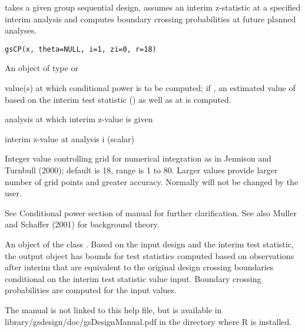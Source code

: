 \begin{Description}\relax
{} takes a given group sequential design, assumes an interim z-statistic 
at a specified interim analysis and computes boundary crossing probabilities at future planned analyses.
\end{Description}
\begin{Usage}
\begin{verbatim}
gsCP(x, theta=NULL, i=1, zi=0, r=18)
\end{verbatim}
\end{Usage}
\begin{Arguments}
\begin{ldescription}
\item[\code{x}] An object of type  or 
\item[\code{theta}]  value(s) at which conditional power is to be computed; if , 
an estimated value of  based on the interim test statistic () as well as at 
is computed.
\item[\code{i}] analysis at which interim z-value is given
\item[\code{zi}] interim z-value at analysis i (scalar)
\item[\code{r}] Integer value controlling grid for numerical integration as in Jennison and Turnbull (2000); 
default is 18, range is 1 to 80. 
Larger values provide larger number of grid points and greater accuracy.
Normally  will not be changed by the user.
\end{ldescription}
\end{Arguments}
\begin{Details}\relax
See Conditional power section of manual for further clarification. See also Muller and Schaffer (2001) for background theory.
\end{Details}
\begin{Value}
An object of the class .
Based on the input design and the interim test statistic, the output object has bounds for test statistics
computed based on observations after interim  that are equivalent to the original design crossing boundaries conditional
on the interim test statistic value input. 
Boundary crossing probabilities are computed for the input 
 values.
\end{Value}
\begin{Note}\relax
The manual is not linked to this help file, but is available in library/gsdesign/doc/gsDesignManual.pdf in the directory where R is installed.
\end{Note}
